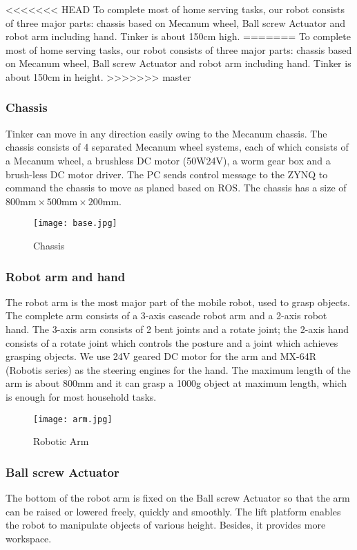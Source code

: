 <<<<<<< HEAD
To complete most of home serving tasks, our robot consists of three major parts: chassis based on Mecanum wheel, Ball screw Actuator and robot arm including hand. Tinker is about 150cm high. 
=======
To complete most of home serving tasks, our robot consists of three major parts: chassis based on Mecanum wheel, Ball screw Actuator and robot arm including hand. Tinker is about 150cm in height. 
>>>>>>> master
\subsubsection{Chassis}
Tinker can move in any direction easily owing to the Mecanum chassis. The chassis consists of 4 separated Mecanum wheel systems, each of which consists of a Mecanum wheel, a brushless DC motor (50W24V), a worm gear box and a brush-less DC motor driver. The PC sends control message to the ZYNQ to command the chassis to move as planed based on ROS. The chassis has a size of $800\text{mm} \times 500\text{mm}\times 200\text{mm}$.
\begin{figure}[!t]
\centering
\texttt{[image: base.jpg]}
    \caption{Chassis}
\end{figure}

\subsubsection{Robot arm and hand}
The robot arm is the most major part of the mobile robot, used to grasp objects. The complete arm consists of a 3-axis cascade robot arm and a 2-axis robot hand. The 3-axis arm consists of 2 bent joints and a rotate joint; the 2-axis hand consists of a rotate joint which controls the posture and a joint which achieves grasping objects. We use 24V geared DC motor for the arm and MX-64R (Robotis series) as the steering engines for the hand. The maximum length of the arm is about 800mm and it can grasp a 1000g object at maximum length, which is enough for most household tasks. 
\begin{figure*}[!t]
	\centering
    \texttt{[image: arm.jpg]}
    \caption{Robotic Arm}
\end{figure*}

\subsubsection{Ball screw Actuator}
The bottom of the robot arm is fixed on the Ball screw Actuator so that the arm can be raised or lowered freely, quickly and smoothly. The lift platform enables the robot to manipulate objects of various height. Besides, it provides more workspace.


